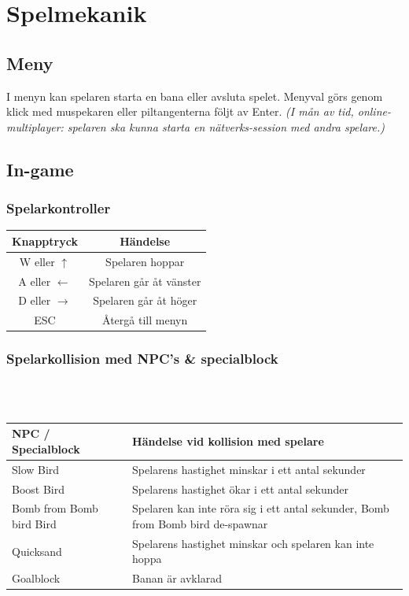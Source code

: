 \documentclass{TDP003mall}
\begin{document}
\newpage

\section{Spelmekanik}
\subsection{Meny}
I menyn kan spelaren starta en bana eller avsluta spelet. Menyval görs genom klick med muspekaren eller piltangenterna följt av Enter. \textit{(I mån av tid, online-multiplayer: spelaren ska kunna starta en nätverks-session med andra spelare.)}

\subsection{In-game}

\subsubsection{Spelarkontroller}
\begin{tabular}{|c|c|}
\hline
\textbf{Knapptryck} & \textbf{Händelse} \\\hline
W eller $\uparrow$ & Spelaren hoppar \\\hline
A eller $\leftarrow$ & Spelaren går åt vänster \\\hline
D eller $\rightarrow$ & Spelaren går åt höger \\\hline
ESC & Återgå till menyn \\\hline
\end{tabular}

\subsubsection{Spelarkollision med NPC's \& specialblock}
\\\\
\begin{tabular}{|l|l|}
\hline
\textbf{NPC / Specialblock} & \textbf{Händelse vid kollision med spelare}\\\hline
Slow Bird & Spelarens hastighet minskar i ett antal sekunder\\\hline
Boost Bird & Spelarens hastighet ökar i ett antal sekunder\\\hline
Bomb from Bomb bird Bird & Spelaren kan inte röra sig i ett antal sekunder, Bomb from Bomb bird de-spawnar\\\hline
Quicksand & Spelarens hastighet minskar och spelaren kan inte hoppa \\\hline
Goalblock & Banan är avklarad \\\hline
\end{tabular}
\end{document}
